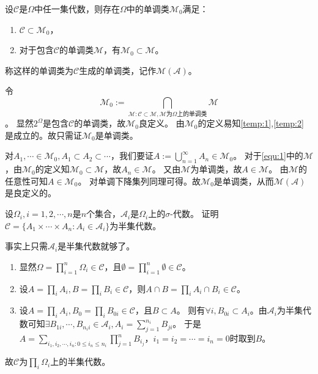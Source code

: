 \documentclass{ctexart}
\begin{document}
\begin{problem}\label{pro:1.4.a}
  设\(\mathcal{C} \)是\(\Omega \)中任一集代数，则存在\(\Omega \)中的单调类\(\mathcal{M}_0 \)满足：
  \begin{enumerate}
    \item \label{temp:1} \(\mathcal{C} \subset \mathcal{M}_0 \)，
    \item \label{temp:2}对于包含\(\mathcal{C} \)的单调类\(\mathcal{M} \)，有\(\mathcal{M}_0 \subset \mathcal{M} \)。
  \end{enumerate}
  称这样的单调类为\(\mathcal{C} \)生成的单调类，记作\(\mathcal{M}(\mathcal{A}) \)。
\end{problem}
\begin{solution}
  令
  \begin{equation}\label{equ:1}
    \mathcal{M}_0:=\bigcap_{\mathcal{M}:\mathcal{C} \subset \mathcal{M}, \mathcal{M} \text{为\(\Omega \)上的单调类}}\mathcal{M}
  \end{equation}
  。
  显然\(2^{\Omega} \)是包含\(\mathcal{C} \)的单调类，故\(\mathcal{M}_0 \)良定义。
  由\(\mathcal{M}_0 \)的定义易知\ref{temp:1},\ref{temp:2} 是成立的。故只需证\(\mathcal{M}_0 \)是单调类。

  对\(A_1,\cdots \in \mathcal{M}_0, A_1 \subset A_2 \subset \cdots\)，我们要证\(A:=\bigcup_{n=1}^{\infty} A_n \in \mathcal{M}_0 \)。
  对于\eqref{equ:1}中的\(\mathcal{M} \)，由\(\mathcal{M}_0 \)的定义知\(\mathcal{M}_0 \subset \mathcal{M} \)，故\(A_n \in \mathcal{M} \)。
  又由\(\mathcal{M} \)为单调类，故\(A \in \mathcal{M} \)。
  由\(\mathcal{M} \)的任意性可知\(A \in \mathcal{M}_0 \)。
  对单调下降集列同理可得。故\(\mathcal{M}_0 \)是单调类，从而\(\mathcal{M}(\mathcal{A}) \)是良定义的。
\end{solution}

\begin{problem}\label{pro:1.4.b}
  设\(\Omega_i ,i=1,2,\cdots,n\)是\(n \)个集合，\(\mathcal{A}_i \)是\(\Omega_i \)上的\(\sigma \)-代数。
  证明\(\mathcal{C}=\{A_1 \times \cdots \times A_n:A_i \in \mathcal{A}_i\} \)为半集代数。
\end{problem}
\begin{solution}
  事实上只需\(\mathcal{A}_i \)是半集代数就够了。
  \begin{enumerate}
    \item 显然\(\Omega=\prod_{i=1}^{n} \Omega_i \in \mathcal{C} \)，且\(\emptyset=\prod_{i=1}^{n} \emptyset  \in \mathcal{C}\)。
    \item 设\(A=\prod_{i}A_i,B=\prod_{i}B_i \in \mathcal{C} \)，则\(A \cap B=\prod_{i}A_i \cap B_i \in \mathcal{C} \)。
    \item 设\(A=\prod_{i}A_i,B_0=\prod_{i}B_{0i} \in \mathcal{C} \)，且\(B \subset A \)。
      则有\(\forall i,B_{0i} \subset A_i \)。由\(\mathcal{A}_i \)为半集代数可知\(\exists B_{1i},\cdots,B_{n_ii} \in \mathcal{A}_i,A_i=\sum_{j=1}^{n_i} B_{ji} \)。
      于是\(A=\sum_{i_1,i_2,\cdots,i_n:0 \leq i_n \leq n_i} \prod_{j=1}^{n} B_{i_j} \)，\(i_1=i_2=\cdots=i_n=0 \)时取到\(B \)。
  \end{enumerate}
  故\(\mathcal{C} \)为\(\prod_{i}\Omega_i \)上的半集代数。
\end{solution}
\end{document}
